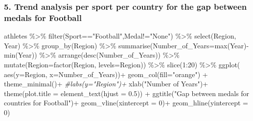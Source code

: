\documentclass[
]{article}
\newenvironment{Shaded}{\begin{snugshade}}{\end{snugshade}}
\newcommand{\AttributeTok}[1]{\textcolor[rgb]{0.77,0.63,0.00}{#1}}
\newcommand{\CommentTok}[1]{\textcolor[rgb]{0.56,0.35,0.01}{\textit{#1}}}
\newcommand{\DecValTok}[1]{\textcolor[rgb]{0.00,0.00,0.81}{#1}}
\newcommand{\FloatTok}[1]{\textcolor[rgb]{0.00,0.00,0.81}{#1}}
\newcommand{\FunctionTok}[1]{\textcolor[rgb]{0.00,0.00,0.00}{#1}}
\newcommand{\NormalTok}[1]{#1}
\newcommand{\SpecialCharTok}[1]{\textcolor[rgb]{0.00,0.00,0.00}{#1}}
\newcommand{\StringTok}[1]{\textcolor[rgb]{0.31,0.60,0.02}{#1}}
\begin{document}
\hypertarget{trend-analysis-per-sport-per-country-for-the-gap-between-medals-for-football}{%
\subsubsection{5. Trend analysis per sport per country for the gap
between medals for
Football}\label{trend-analysis-per-sport-per-country-for-the-gap-between-medals-for-football}}

\begin{Shaded}
\begin{Highlighting}[]
\NormalTok{athletes }\SpecialCharTok{\%\textgreater{}\%}
\FunctionTok{filter}\NormalTok{(Sport}\SpecialCharTok{==}\StringTok{"Football"}\NormalTok{,Medal}\SpecialCharTok{!=}\StringTok{"None"}\NormalTok{) }\SpecialCharTok{\%\textgreater{}\%}
\FunctionTok{select}\NormalTok{(Region, Year) }\SpecialCharTok{\%\textgreater{}\%}
\FunctionTok{group\_by}\NormalTok{(Region) }\SpecialCharTok{\%\textgreater{}\%}
\FunctionTok{summarise}\NormalTok{(}\AttributeTok{Number\_of\_Years=}\FunctionTok{max}\NormalTok{(Year)}\SpecialCharTok{{-}}\FunctionTok{min}\NormalTok{(Year)) }\SpecialCharTok{\%\textgreater{}\%}
\FunctionTok{arrange}\NormalTok{(}\FunctionTok{desc}\NormalTok{(Number\_of\_Years)) }\SpecialCharTok{\%\textgreater{}\%}
\FunctionTok{mutate}\NormalTok{(}\AttributeTok{Region=}\FunctionTok{factor}\NormalTok{(Region, }\AttributeTok{levels=}\NormalTok{Region)) }\SpecialCharTok{\%\textgreater{}\%}
\FunctionTok{slice}\NormalTok{(}\DecValTok{1}\SpecialCharTok{:}\DecValTok{20}\NormalTok{) }\SpecialCharTok{\%\textgreater{}\%}
\FunctionTok{ggplot}\NormalTok{( }\FunctionTok{aes}\NormalTok{(}\AttributeTok{y=}\NormalTok{Region, }\AttributeTok{x=}\NormalTok{Number\_of\_Years))}\SpecialCharTok{+}
\FunctionTok{geom\_col}\NormalTok{(}\AttributeTok{fill=}\StringTok{"orange"}\NormalTok{) }\SpecialCharTok{+}
\FunctionTok{theme\_minimal}\NormalTok{()}\SpecialCharTok{+}
\CommentTok{\#labs(y="Region")+}
\FunctionTok{xlab}\NormalTok{(}\StringTok{"Number of Years"}\NormalTok{)}\SpecialCharTok{+}
\FunctionTok{theme}\NormalTok{(}\AttributeTok{plot.title =} \FunctionTok{element\_text}\NormalTok{(}\AttributeTok{hjust =} \FloatTok{0.5}\NormalTok{)) }\SpecialCharTok{+}
\FunctionTok{ggtitle}\NormalTok{(}\StringTok{"Gap between medals for countries for Football"}\NormalTok{)}\SpecialCharTok{+}
\FunctionTok{geom\_vline}\NormalTok{(}\AttributeTok{xintercept =} \DecValTok{0}\NormalTok{)}\SpecialCharTok{+}
\FunctionTok{geom\_hline}\NormalTok{(}\AttributeTok{yintercept =} \DecValTok{0}\NormalTok{)}
\end{Highlighting}
\end{Shaded}
\end{document}
